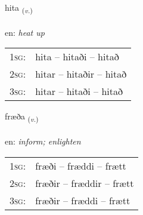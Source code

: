 \documentclass[frontgrid, backgrid]{flacards}\usepackage[]{graphicx}\usepackage[]{xcolor}
\begin{document}
\renewcommand{\blhead}{\vskip5pt {\small\bfseries\footnotesize Sagnorð | Verb }}
\renewcommand{\bcfoot}{\vskip5pt \hspace{2pt}{\small\bfseries\footnotesize 3K}}


{hita \small{\textsubscript{(\textit{v.})}} \\[1ex] %
\textphonetic{[hɪːta]} \\
en: \emph{heat up} \\  [2ex]
\renewcommand*{\arraystretch}{0.8}
\begin{tabular}{p{1cm}l}
\textsc{1sg}: & hita -- hitaði -- hitað \\ 
\textsc{2sg}: & hitar -- hitaðir -- hitað \\ 
\textsc{3sg}: & hitar -- hitaði -- hitað \\ 
\end{tabular}
}

\renewcommand{\flhead}{\vskip5pt \fboxsep=0pt {\small\bfseries\footnotesize Sagnorð | Verb}}
\renewcommand{\fcfoot}{\vskip5pt \fboxsep=0pt \hspace{2pt}{\small\bfseries\footnotesize 3K}}

\renewcommand{\blhead}{\vskip5pt {\small\bfseries\footnotesize Sagnorð | Verb }}
\renewcommand{\bcfoot}{\vskip5pt \hspace{2pt}{\small\bfseries\footnotesize 3K}}


{fræða \small{\textsubscript{(\textit{v.})}} \\[1ex] %
\textphonetic{[fraiːða]} \\
en: \emph{inform; enlighten} \\  [2ex]
\renewcommand*{\arraystretch}{0.8}
\begin{tabular}{p{1cm}l}
\textsc{1sg}: & fræði -- fræddi -- frætt \\ 
\textsc{2sg}: & fræðir -- fræddir -- frætt \\ 
\textsc{3sg}: & fræðir -- fræddi -- frætt \\ 
\end{tabular}
}
\end{document}
